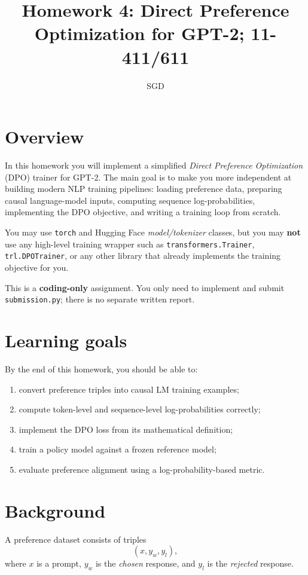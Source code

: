 \documentclass[11pt]{article}
\title{Homework 4: Direct Preference Optimization for GPT-2; 11-411/611}
\date{}
\author{SGD}
\begin{document}
\maketitle

\section*{Overview}

In this homework you will implement a simplified \emph{Direct Preference Optimization} (DPO) trainer for GPT-2. The main goal is to make you more independent at building modern NLP training pipelines: loading preference data, preparing causal language-model inputs, computing sequence log-probabilities, implementing the DPO objective, and writing a training loop from scratch.

You may use \texttt{torch} and Hugging Face \emph{model/tokenizer} classes, but you may \textbf{not} use any high-level training wrapper such as \texttt{transformers.Trainer}, \texttt{trl.DPOTrainer}, or any other library that already implements the training objective for you.

This is a \textbf{coding-only} assignment. You only need to implement and submit \texttt{submission.py}; there is no separate written report.

\section*{Learning goals}

By the end of this homework, you should be able to:
\begin{enumerate}[itemsep=0.25em]
    \item convert preference triples into causal LM training examples;
    \item compute token-level and sequence-level log-probabilities correctly;
    \item implement the DPO loss from its mathematical definition;
    \item train a policy model against a frozen reference model;
    \item evaluate preference alignment using a log-probability-based metric.
\end{enumerate}

\section*{Background}

A preference dataset consists of triples
\[
(x, y_w, y_l),
\]
where \(x\) is a prompt, \(y_w\) is the \emph{chosen} response, and \(y_l\) is the \emph{rejected} response.
\end{document}
